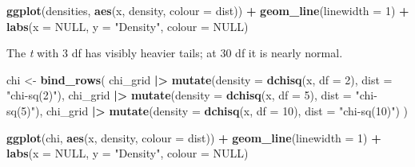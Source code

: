 \documentclass[
]{article}
\newenvironment{Shaded}{\begin{snugshade}}{\end{snugshade}}
\newcommand{\AttributeTok}[1]{\textcolor[rgb]{0.13,0.29,0.53}{#1}}
\newcommand{\ConstantTok}[1]{\textcolor[rgb]{0.56,0.35,0.01}{#1}}
\newcommand{\DecValTok}[1]{\textcolor[rgb]{0.00,0.00,0.81}{#1}}
\newcommand{\FunctionTok}[1]{\textcolor[rgb]{0.13,0.29,0.53}{\textbf{#1}}}
\newcommand{\NormalTok}[1]{#1}
\newcommand{\OtherTok}[1]{\textcolor[rgb]{0.56,0.35,0.01}{#1}}
\newcommand{\SpecialCharTok}[1]{\textcolor[rgb]{0.81,0.36,0.00}{\textbf{#1}}}
\newcommand{\StringTok}[1]{\textcolor[rgb]{0.31,0.60,0.02}{#1}}
\begin{document}
\begin{Shaded}
\begin{Highlighting}[]
\FunctionTok{ggplot}\NormalTok{(densities, }\FunctionTok{aes}\NormalTok{(x, density, }\AttributeTok{colour =}\NormalTok{ dist)) }\SpecialCharTok{+}
  \FunctionTok{geom\_line}\NormalTok{(}\AttributeTok{linewidth =} \DecValTok{1}\NormalTok{) }\SpecialCharTok{+}
  \FunctionTok{labs}\NormalTok{(}\AttributeTok{x =} \ConstantTok{NULL}\NormalTok{, }\AttributeTok{y =} \StringTok{"Density"}\NormalTok{, }\AttributeTok{colour =} \ConstantTok{NULL}\NormalTok{)}
\end{Highlighting}
\end{Shaded}

The \emph{t} with 3 df has visibly heavier tails; at 30 df it is nearly
normal.

\begin{Shaded}
\begin{Highlighting}[]
\NormalTok{chi }\OtherTok{\textless{}{-}} \FunctionTok{bind\_rows}\NormalTok{(}
\NormalTok{  chi\_grid }\SpecialCharTok{|\textgreater{}} \FunctionTok{mutate}\NormalTok{(}\AttributeTok{density =} \FunctionTok{dchisq}\NormalTok{(x, }\AttributeTok{df =} \DecValTok{2}\NormalTok{), }\AttributeTok{dist =} \StringTok{"chi{-}sq(2)"}\NormalTok{),}
\NormalTok{  chi\_grid }\SpecialCharTok{|\textgreater{}} \FunctionTok{mutate}\NormalTok{(}\AttributeTok{density =} \FunctionTok{dchisq}\NormalTok{(x, }\AttributeTok{df =} \DecValTok{5}\NormalTok{), }\AttributeTok{dist =} \StringTok{"chi{-}sq(5)"}\NormalTok{),}
\NormalTok{  chi\_grid }\SpecialCharTok{|\textgreater{}} \FunctionTok{mutate}\NormalTok{(}\AttributeTok{density =} \FunctionTok{dchisq}\NormalTok{(x, }\AttributeTok{df =} \DecValTok{10}\NormalTok{), }\AttributeTok{dist =} \StringTok{"chi{-}sq(10)"}\NormalTok{)}
\NormalTok{)}
\end{Highlighting}
\end{Shaded}

\begin{Shaded}
\begin{Highlighting}[]
\FunctionTok{ggplot}\NormalTok{(chi, }\FunctionTok{aes}\NormalTok{(x, density, }\AttributeTok{colour =}\NormalTok{ dist)) }\SpecialCharTok{+}
  \FunctionTok{geom\_line}\NormalTok{(}\AttributeTok{linewidth =} \DecValTok{1}\NormalTok{) }\SpecialCharTok{+}
  \FunctionTok{labs}\NormalTok{(}\AttributeTok{x =} \ConstantTok{NULL}\NormalTok{, }\AttributeTok{y =} \StringTok{"Density"}\NormalTok{, }\AttributeTok{colour =} \ConstantTok{NULL}\NormalTok{)}
\end{Highlighting}
\end{Shaded}
\end{document}
